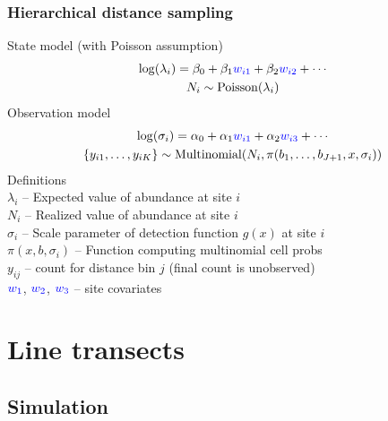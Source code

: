 \documentclass[color=usenames,dvipsnames]{beamer}\usepackage[]{graphicx}\usepackage[]{color}
\begin{document}
\begin{frame}
  \frametitle{Hierarchical distance sampling}
  \small
  State model (with Poisson assumption)
  \begin{gather*}
    \mathrm{log}(\lambda_i) = \beta_0 + \beta_1 {\color{blue} w_{i1}} +
    \beta_2 {\color{blue} w_{i2}} + \cdots \\
    N_i \sim \mathrm{Poisson}(\lambda_i)
  \end{gather*}
  \pause
  Observation model
  \begin{gather*}
    \mathrm{log}(\sigma_{i}) = \alpha_0 + \alpha_1 {\color{blue} w_{i1}}
    + \alpha_2 {\color{blue} w_{i3}} + \cdots \\
    \{y_{i1}, \dots, y_{iK}\}  \sim \mathrm{Multinomial}(N_i,
    \pi(b_1, \dots, b_{J+1}, x, \sigma_i))
  \end{gather*}
  \pause
  \small
  Definitions \\
  $\lambda_i$ -- Expected value of abundance at site $i$ \\
  $N_i$ -- Realized value of abundance at site $i$ \\
  $\sigma_{i}$ -- Scale parameter of detection function $g(x)$ at site $i$ \\
  $\pi(x,b,\sigma_i)$ -- Function computing multinomial cell probs \\
  $y_{ij}$ -- count for distance bin $j$ (final count is unobserved) \\
  $\color{blue} w_1$, $\color{blue} w_2$, $\color{blue} w_3$ -- site covariates %
\end{frame}












\section{Line transects}






\subsection{Simulation}
\end{document}
